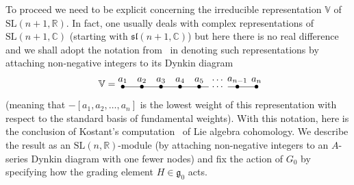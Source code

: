 \documentclass[11pt]{article}
\begin{document}
To proceed we need to be explicit concerning the irreducible representation
${\mathbb{V}}$ of ${\mathrm{SL}}(n+1,{\mathbb{R}})$. In fact, one usually deals
with complex representations of ${\mathrm{SL}}(n+1,{\mathbb{C}})$ (starting
with ${\mathfrak{sl}}(n+1,{\mathbb{C}})$) but here there is no real dif\/ference
and we shall adopt the notation from~\cite{beastwood} in denoting such
representations by attaching non-negative integers to its Dynkin diagram
\[{\mathbb{V}}=\enskip\raisebox{-5pt}{\begin{picture}(140,17)
\put(0,5){\makebox(0,0){$\bullet$}}
\put(20,5){\makebox(0,0){$\bullet$}}
\put(40,5){\makebox(0,0){$\bullet$}}
\put(60,5){\makebox(0,0){$\bullet$}}
\put(80,5){\makebox(0,0){$\bullet$}}
\put(120,5){\makebox(0,0){$\bullet$}}
\put(140,5){\makebox(0,0){$\bullet$}}
\put(0,5){\line(1,0){90}}
\put(100,5){\makebox(0,0){\scriptsize$\cdots$}}
\put(110,5){\line(1,0){30}}
\put(0,12){\makebox(0,0){\scriptsize$a_1$}}
\put(20,12){\makebox(0,0){\scriptsize$a_2$}}
\put(40,12){\makebox(0,0){\scriptsize$a_3$}}
\put(60,12){\makebox(0,0){\scriptsize$a_4$}}
\put(80,12){\makebox(0,0){\scriptsize$a_5$}}
\put(100,12){\makebox(0,0){\scriptsize$\cdots$}}
\put(120,12){\makebox(0,0){\scriptsize$a_{n-1}$}}
\put(140,12){\makebox(0,0){\scriptsize$a_n$}}
\end{picture}}\]
(meaning that $-[a_1,a_2,\dots,a_n]$ is the lowest weight of this
representation with respect to the standard basis of fundamental weights).
With this notation, here is the conclusion of Kostant's computation~\cite{k}
of Lie algebra cohomology. We describe the result as an
${\mathrm{SL}}(n,{\mathbb{R}})$-module (by attaching non-negative integers to
an $A$-series Dynkin diagram with one fewer nodes) and f\/ix the action of $G_0$
by specifying how the grading element $H\in{\mathfrak{g}}_0$ acts.
\end{document}
